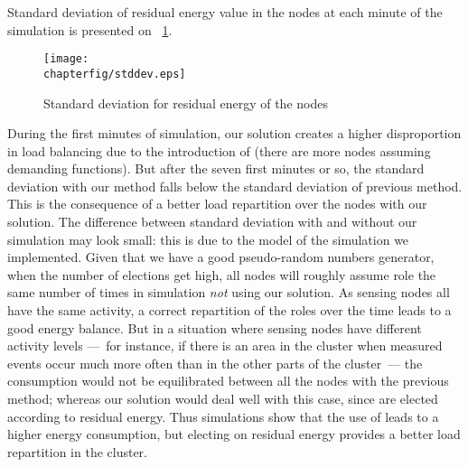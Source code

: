 Standard deviation of residual energy value in the nodes at each minute of the simulation is presented on \figurename~\ref{se:fig:stddev}.
\begin{figure}[ht]
    \centering
    \texttt{[image: \\chapterfig/stddev.eps]}
    \caption{Standard deviation for residual energy of the nodes}\label{se:fig:stddev}
\end{figure}
During the first minutes of simulation, our solution creates a higher disproportion in load balancing due to the introduction of \vns (there are more nodes assuming demanding functions).
But after the seven first minutes or so, the standard deviation with our method falls below the standard deviation of previous method.
This is the consequence of a better load repartition over the nodes with our solution.
The difference between standard deviation with and without our simulation may look small: this is due to the model of the simulation we implemented.
Given that we have a good pseudo-random numbers generator, when the number of elections get high, all nodes will roughly assume \cn role the same number of times in simulation \emph{not} using our solution.
As sensing nodes all have the same activity, a correct repartition of the \cn roles over the time leads to a good energy balance.
But in a situation where sensing nodes have different activity levels ---~for instance, if there is an area in the cluster when measured events occur much more often than in the other parts of the cluster~--- the consumption would not be equilibrated between all the nodes with the previous method; whereas our solution would deal well with this case, since \cns are elected according to residual energy.
Thus simulations show that the use of \vns leads to a higher energy consumption, but electing \cns on residual energy provides a better load repartition in the cluster.
